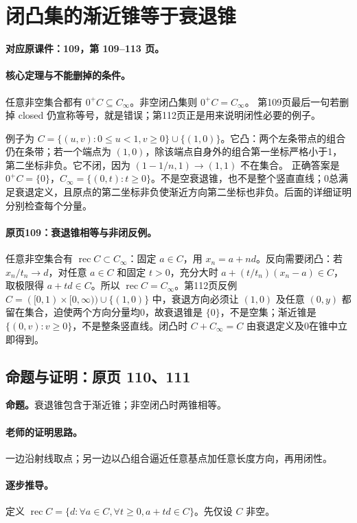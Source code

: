 \documentclass[11pt,a4paper]{article}
\theoremstyle{definition}\newtheorem{definition}{定义}\newtheorem{example}{例}
\begin{document}
\clearpage\section{闭凸集的渐近锥等于衰退锥}\label{g:109:109}

\textbf{对应原课件：109，第 109--113 页。}


\paragraph{核心定理与不能删掉的条件。}
任意非空集合都有 $0^+C\subseteq C_\infty$。非空闭凸集则 $0^+C=C_\infty$。
第109页最后一句若删掉 closed 仍宣称等号，就是错误；第112页正是用来说明闭性必要的例子。

例子为 $C=\{(u,v):0\le u<1,v\ge0\}\cup\{(1,0)\}$。它凸：两个左条带点的组合仍在条带；若一个端点为 $(1,0)$，除该端点自身外的组合第一坐标严格小于1，第二坐标非负。它不闭，因为 $(1-1/n,1)\to(1,1)$ 不在集合。
正确答案是 $0^+C=\{0\}$，$C_\infty=\{(0,t):t\ge0\}$。不是空衰退锥，也不是整个竖直直线；0总满足衰退定义，且原点的第二坐标非负使渐近方向第二坐标也非负。后面的详细证明分别检查每个分量。


\paragraph{原页109：衰退锥相等与非闭反例。}任意非空集合有 $\operatorname{rec}C\subset C_\infty$：固定 $a\in C$，用 $x_n=a+nd$。反向需要闭凸：若 $x_n/t_n\to d$，对任意 $a\in C$ 和固定 $t>0$，充分大时 $a+(t/t_n)(x_n-a)\in C$，取极限得 $a+td\in C$。所以 $\operatorname{rec}C=C_\infty$。第112页反例 $C=([0,1)\times[0,\infty))\cup\{(1,0)\}$ 中，衰退方向必须让 $(1,0)$ 及任意 $(0,y)$ 都留在集合，迫使两个方向分量均0，故衰退锥是 $\{0\}$，不是空集；渐近锥是 $\{(0,v):v\ge0\}$，不是整条竖直线。闭凸时 $C+C_\infty=C$ 由衰退定义及0在锥中立即得到。



\subsection{命题与证明：原页 110、111}

\textbf{命题。}衰退锥包含于渐近锥；非空闭凸时两锥相等。

\paragraph{老师的证明思路。}一边沿射线取点；另一边以凸组合逼近任意基点加任意长度方向，再用闭性。

\paragraph{逐步推导。}
定义 $\operatorname{rec}C=\{d:\forall a\in C,\forall t\ge0,a+td\in C\}$。先仅设 $C$ 非空。
\end{document}
